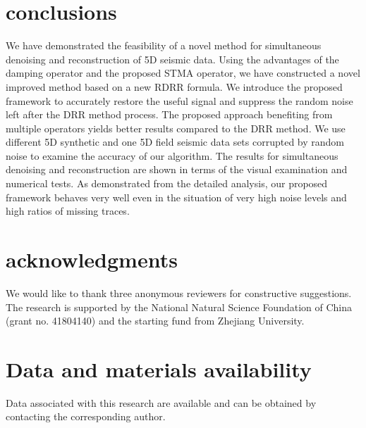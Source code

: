 \section{conclusions}
We have demonstrated the feasibility of a novel method for simultaneous denoising and reconstruction of 5D seismic data. Using the advantages of the damping operator and the proposed STMA operator, we have constructed a novel improved method based on a new RDRR formula. We introduce the proposed framework to accurately restore the useful signal and suppress the random noise left after the DRR method process. The proposed approach benefiting from multiple operators yields better results compared to the DRR method. We use different 5D synthetic and one 5D field seismic data sets corrupted by random noise to examine the accuracy of our algorithm. The results for simultaneous denoising and reconstruction are shown in terms of the visual examination and numerical tests. As demonstrated from the detailed analysis, our proposed framework behaves very well even in the situation of very high noise levels and high ratios of missing traces.

\section{acknowledgments}
We would like to thank three anonymous reviewers for constructive suggestions. The research is supported by the National Natural Science Foundation of China (grant no. 41804140) and the starting fund from Zhejiang University.

\section{Data and materials availability}
Data associated with this research are available and can be obtained by contacting the corresponding author.





\newpage
\listoftables

\newpage
\listoffigures

%






